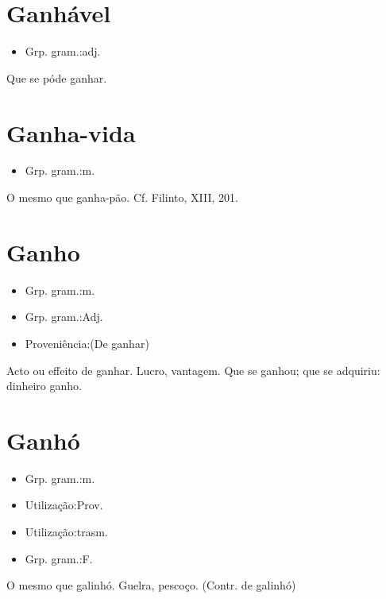 \section{Ganhável}
\begin{itemize}
\item {Grp. gram.:adj.}
\end{itemize}
Que se póde ganhar.
\section{Ganha-vida}
\begin{itemize}
\item {Grp. gram.:m.}
\end{itemize}
O mesmo que \textunderscore ganha-pão\textunderscore . Cf. Filinto, XIII, 201.
\section{Ganho}
\begin{itemize}
\item {Grp. gram.:m.}
\end{itemize}
\begin{itemize}
\item {Grp. gram.:Adj.}
\end{itemize}
\begin{itemize}
\item {Proveniência:(De \textunderscore ganhar\textunderscore )}
\end{itemize}
Acto ou effeito de ganhar.
Lucro, vantagem.
Que se ganhou; que se adquiriu: \textunderscore dinheiro ganho\textunderscore .
\section{Ganhó}
\begin{itemize}
\item {Grp. gram.:m.}
\end{itemize}
\begin{itemize}
\item {Utilização:Prov.}
\end{itemize}
\begin{itemize}
\item {Utilização:trasm.}
\end{itemize}
\begin{itemize}
\item {Grp. gram.:F.}
\end{itemize}
O mesmo que \textunderscore galinhó\textunderscore .
Guelra, pescoço.
(Contr. de \textunderscore galinhó\textunderscore )
